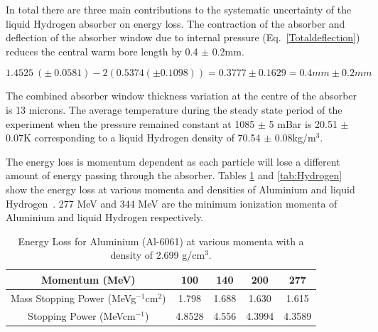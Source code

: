 In total there are three main contributions to the systematic uncertainty of the liquid Hydrogen absorber on energy loss. The contraction of the absorber and deflection of the absorber window due to internal pressure (Eq.~\ref{Totaldeflection}) reduces the central warm bore length by 0.4 $\mathrm{\pm}$ 0.2mm.

\begin{equation}
    1.4525\ \left(\pm \ 0.0581\right)-2\left(0.5374\left(\pm 0.1098\right)\right)=0.3777\pm 0.1629=0.4mm\pm 0.2mm
\label{Totaldeflection}    
\end{equation}

The combined absorber window thickness variation at the centre of the absorber is 13 microns. The average temperature during the steady state period of the experiment when the pressure remained constant at 1085 $\mathrm{\pm}$ 5 mBar is 20.51 $\mathrm{\pm}$ 0.07K corresponding to a liquid Hydrogen density of 70.54 $\mathrm{\pm}$ 0.08kg/m${}^{3}$.

The energy loss is momentum dependent as each particle will lose a different amount of energy passing through the absorber. Tables \ref{tab:Aluminium} and \ref{tab:Hydrogen} show the energy loss at various momenta and densities of Aluminium and liquid Hydrogen~\cite{AtomicAluminium}\cite{AtomicHydrogen}\cite{MuonAluminium}\cite{MuonliquidHydrogen}. 277 MeV and 344 MeV are the minimum ionization momenta of Aluminium and liquid Hydrogen respectively.


\begin{table}[htb!]
  \caption{
    Energy Loss for Aluminium (Al-6061) at various momenta with a density of 2.699 g/cm${}^{3}$.
  }
  \label{tab:Aluminium}
  \begin{center}
    \begin{tabular}{|c c c c c|}
    \hline

Momentum (MeV) & 100 & 140 & 200 & 277     \rule{0pt}{14pt} \\
\hline
{Mass Stopping Power (MeVg${}^{-1}$cm${}^{2}$)} & 1.798 & 1.688 & 1.630 & 1.615
\\
{Stopping Power (MeVcm${}^{-1}$)} & 4.8528 & 4.556 & 4.3994 & 4.3589
\\

    \hline
    \end{tabular}
  \end{center}
\end{table} 

